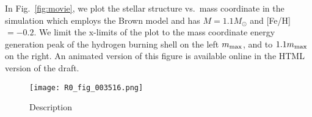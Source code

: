 In Fig.~\ref{fig:movie}, we plot the stellar structure vs.~mass coordinate in the simulation which employs the Brown model and has $M = 1.1M_\odot$ and [Fe/H] $= -0.2$.
We limit the x-limits of the plot to the mass coordinate energy generation peak of the hydrogen burning shell on the left $m_{\rm max}$, and to $1.1 m_{\rm max}$ on the right.
An animated version of this figure is available online in the HTML version of the draft.

\begin{figure}[!tb]
\begin{center}
\texttt{[image: R0\_fig\_003516.png]}
\caption{
    Description
    }
\label{Fig:movie}
\end{center}
\end{figure}